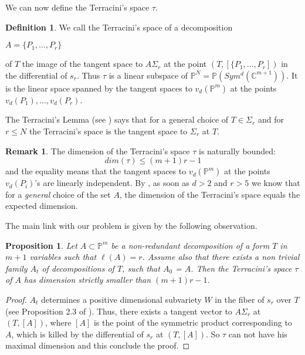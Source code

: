 \documentclass[a4paper,10pt,oneside]{article}
\theoremstyle{casep}
\newcommand{\C}{\mathbb{C}}
\newcommand{\Pj}{\mathbb{P}}
\newtheorem{proposition}[theorem]{Proposition}
\theoremstyle{definition}
\newtheorem{definition}[theorem]{Definition}
\newtheorem{remark}[theorem]{Remark}
\begin{document}
We can now define the Terracini's space $\tau$.

\begin{definition} We call the Terracini's space of a decomposition \begin{small} $A = \{ P_1,\dots ,P_r \}$ \end{small}of $T$ the image of the tangent space to $A\Sigma_r$ 
at the point $(T, [\{ P_1,\dots ,P_r])$ in the differential of $s_r$. Thus $\tau$ is a linear subspace of $\Pj^N = \Pj(Sym^d(\C^{m+1}))$.
 It is the linear space spanned by the tangent spaces to $v_d(\Pj^m)$ at the points $v_d(P_1),\dots ,v_d(P_r)$. 
\end{definition} 

The Terracini's Lemma (see \cite{diciannove}) says that for a general choice of $T\in \Sigma_r$ and for $r\leq N$
the Terracini's space is the tangent space to $\Sigma_r$ at $T$.

\begin{remark} The dimension of the Terracini's space $\tau$ is naturally bounded:
$$dim(\tau ) \leq (m + 1)r - 1$$
and the equality means that the tangent spaces to $v_d(\Pj^m)$ at the points $v_d(P_i)$'s are linearly independent.
By \cite{ventidue}, as soon as $d>2$ and $r>5$ we know that for a \emph{general} choice of the set $A$, 
the dimension of the Terracini's space equals the expected dimension.
\end{remark}

The main link with our problem is given by the following observation.

\begin{proposition}\label{nofam} Let $A \subset \Pj^m$ be a non-redundant decomposition of a form $T$ in $ m+1 $ variables such that $ \ell(A)=r$. Assume also that there exists a non trivial family $A_t$ of decompositions of $T$, such that $A_0$ = $A$. 
Then the Terracini's space $\tau$ of $A$ has dimension strictly smaller than $(m + 1)r - 1$.
\end{proposition}
\begin{proof} $A_t$ determines a positive dimensional subvariety $W$ in the fiber of $s_r$ over $T$ (see Proposition 2.3 of \cite{sette}). 
Thus, there exists a tangent vector to $A\Sigma_r$ at $(T, [A])$, where $[A]$ is the point of the symmetric 
product corresponding to $A$, which is killed by the differential of $s_r$ at $(T, [A])$. 
So $\tau$ can not have his maximal dimension and this conclude the proof. 


\end{proof}
\end{document}
